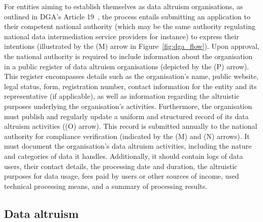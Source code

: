 For entities aiming to establish themselves as data altruism organisations, as outlined in DGA's Article 19~\citeyearpar{noauthor_regulation_2022}, the process entails submitting an application to their competent national authority (which may be the same authority regulating national data intermediation service providers for instance) to express their intentions (illustrated by the (M) arrow in Figure~\ref{fig:dga_flow}).
Upon approval, the national authority is required to include information about the organisation in a public register of data altruism organisations (depicted by the (P) arrow).
This register encompasses details such as the organisation's name, public website, legal status, form, registration number, contact information for the entity and its representative (if applicable), as well as information regarding the altruistic purposes underlying the organisation's activities.
Furthermore, the organisation must publish and regularly update a uniform and structured record of its data altruism activities ((O) arrow).
This record is submitted annually to the national authority for compliance verification (indicated by the (M) and (N) arrows).
It must document the organisation's data altruism activities, including the nature and categories of data it handles.
Additionally, it should contain logs of data users, their contact details, the processing date and duration, the altruistic purposes for data usage, fees paid by users or other sources of income, used technical processing means, and a summary of processing results.

\subsection{Data altruism}
\label{sec:altruism}

